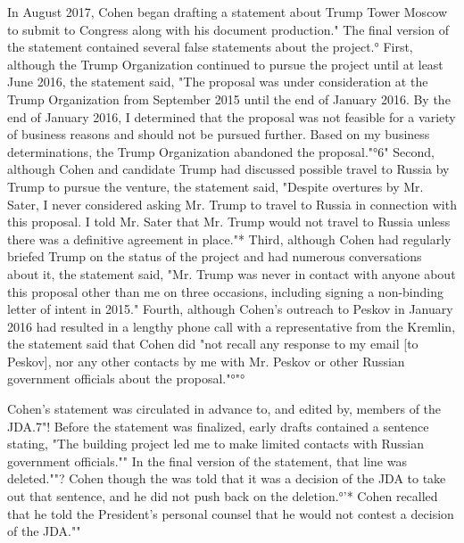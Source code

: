 In August 2017, Cohen began drafting a statement about Trump Tower Moscow to submit to Congress along with his document production."
The final version of the statement contained several false statements about the project.°
First, although the Trump Organization continued to pursue the project until at least June 2016, the statement said, "The proposal was under consideration at the Trump Organization from September 2015 until the end of January 2016.
By the end of January 2016, I determined that the proposal was not feasible for a variety of business reasons and should not be pursued further.
Based on my business determinations, the Trump Organization abandoned the proposal."°6"
Second, although Cohen and candidate Trump had discussed possible travel to Russia by Trump to pursue the venture, the statement said, "Despite overtures by Mr. Sater, I never considered asking Mr. Trump to travel to Russia in connection with this proposal.
I told Mr. Sater that Mr. Trump would not travel to Russia unless there was a definitive agreement in place."*
Third, although Cohen had regularly briefed Trump on the status of the project and had numerous conversations about it, the statement said, "Mr. Trump was never in contact with anyone about this proposal other than me on three occasions, including signing a non-binding letter of intent in 2015."
Fourth, although Cohen's outreach to Peskov in January 2016 had resulted in a lengthy phone call with a representative from the Kremlin, the statement said that Cohen did "not recall any response to my email [to Peskov], nor any other contacts by me with Mr. Peskov or other Russian government officials about the proposal."°"°

Cohen's statement was circulated in advance to, and edited by, members of the JDA.7"!
Before the statement was finalized, early drafts contained a sentence stating, "The building project led me to make limited contacts with Russian government officials.""
In the final version of the statement, that line was deleted.""?
Cohen though the was told that it was a decision of the JDA to take out that sentence, and he did not push back on the deletion.°'*
Cohen recalled that he told the President's personal counsel that he would not contest a decision of the JDA.""

